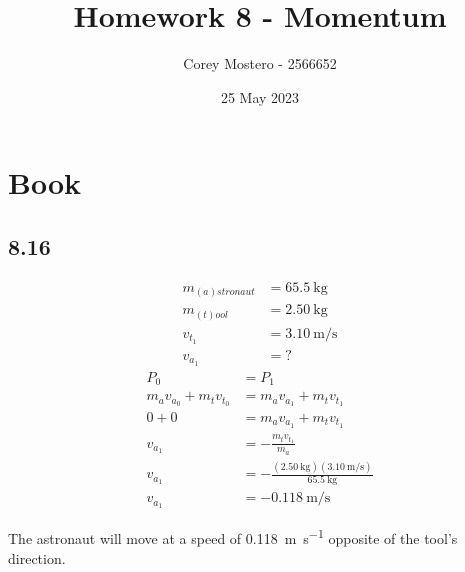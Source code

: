 \documentclass{article}
\title{Homework 8 - Momentum}
\author{Corey Mostero - 2566652}
\date{25 May 2023}
\begin{document}
\newcommand{\hr}{\par\noindent\rule{\textwidth}{0.4pt}}

\newcommand{\bc}[1]{
	\begin{equation*}
		\begin{boxed}
			{#1}
		\end{boxed}
	\end{equation*}
}

\newcommand{\cond}[2]{
	\ifmmode
		{#1} \quad {#2}
	\else
		$$ {#1} \quad {#2} $$
	\fi
}

\newcommand{\matr}[1]{
	\ifmmode \bm{#1}
	\else \textit{\textbf{#1}}
	\fi
}
\newcommand{\vect}[1]{
	\ifmmode \mathbf{#1}
	\else \textbf{#1}
	\fi
}

\maketitle
\newpage

\tableofcontents

\section{Book}

\subsection{8.16}

\begin{align*}
	m_{(a)stronaut} & = \SI{65.5}{\kilogram} \\
	m_{(t)ool} & = \SI{2.50}{\kilogram} \\
	v_{t_1} & = \SI{3.10}{\meter \per \second} \\
	v_{a_1} & = ?
\end{align*}
\begin{align*}
	P_0 & = P_1 \\
	m_av_{a_0} + m_tv_{t_0} & = m_av_{a_1} + m_tv_{t_1} \\
	0 + 0 & = m_av_{a_1} + m_tv_{t_1} \\
	v_{a_1} & = -\frac{m_tv_{t_1}}{m_a} \\
	v_{a_1} & = -\frac{(\SI{2.50}{\kilogram})(\SI{3.10}{\meter \per \second})}{\SI{65.5}{\kilogram}} \\
	v_{a_1} & = \SI{-0.118}{\meter \per \second}
\end{align*}
\begin{mdframed}
	The astronaut will move at a speed of \SI{0.118}{\meter \per \second} opposite of the tool's direction.
\end{mdframed}
\end{document}
